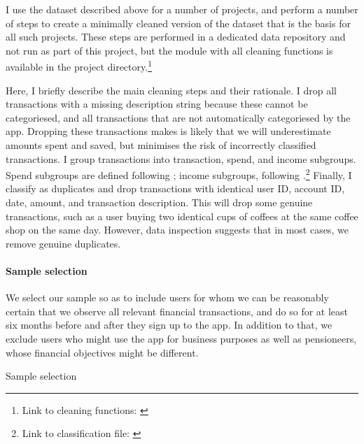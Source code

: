 I use the dataset described above for a number of projects, and perform a
number of steps to create a minimally cleaned version of the dataset that is
the basis for all such projects. These steps are performed in a dedicated
data repository and not run as part of this project, but the module with
all cleaning functions is available in the project directory.\footnote{Link to
    cleaning functions:
\href{https:/egithub.com/fabiangunzinger/mdb_eval/blob/f51e49c95c5884d2dc417be23921a8acd85aec9d/src/data/clean.py}{\faGithub}}

Here, I briefly describe the main cleaning steps and their rationale. I drop
all transactions with a missing description string because these cannot be
categoriesed, and all transactions that are not automatically categoriesed by
the app. Dropping these transactions makes is likely that we will underestimate
amounts spent and saved, but minimises the risk of incorrectly classified
transactions. I group transactions into transaction, spend, and income
subgroups. Spend subgroups are defined following \citet{muggleton2020evidence};
income subgroups, following \citet{hacioglu2020distributional}.\footnote{Link
to classification file:
\href{https://github.com/fabiangunzinger/mdb_eval/blob/92af366d4c4052cc7a7f78a6178086de8ecdfb75/src/data/txn_classifications.py}{\faGithub}}
Finally, I classify as duplicates and drop transactions with identical user ID,
account ID, date, amount, and transaction description. This will drop some
genuine transactions, such as a user buying two identical cups of coffees at
the same coffee shop on the same day. However, data inspection suggests that in
most cases, we remove genuine duplicates.


\paragraph{Sample selection}%
\label{par:sample_selection}

We select our sample so as to include users for whom we can be reasonably
certain that we observe all relevant financial transactions, and do so for at
least six months before and after they sign up to the app. In addition to that,
we exclude users who might use the app for business purposes as well as
pensioneers, whose financial objectives might be different.

\begin{table}
\centering
\caption{Sample selection}\label{tab:selection}

\end{table}


